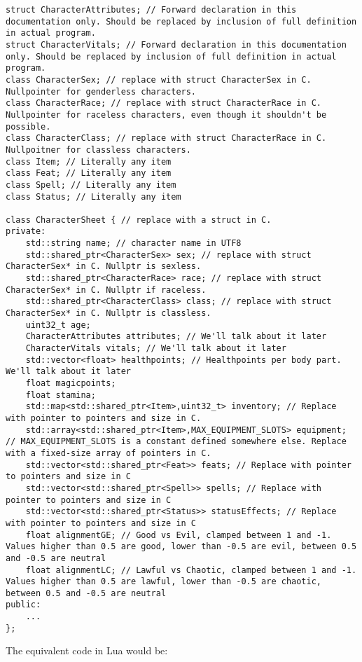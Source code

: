 \documentclass[openany,11pt,a4paper]{book}
\begin{document}
\begin{lstlisting}[style=CPPStyle]
struct CharacterAttributes; // Forward declaration in this documentation only. Should be replaced by inclusion of full definition in actual program.
struct CharacterVitals; // Forward declaration in this documentation only. Should be replaced by inclusion of full definition in actual program.
class CharacterSex; // replace with struct CharacterSex in C. Nullpointer for genderless characters.
class CharacterRace; // replace with struct CharacterRace in C. Nullpointer for raceless characters, even though it shouldn't be possible.
class CharacterClass; // replace with struct CharacterRace in C. Nullpoitner for classless characters.
class Item; // Literally any item
class Feat; // Literally any item
class Spell; // Literally any item
class Status; // Literally any item

class CharacterSheet { // replace with a struct in C.
private:
	std::string name; // character name in UTF8
	std::shared_ptr<CharacterSex> sex; // replace with struct CharacterSex* in C. Nullptr is sexless.
	std::shared_ptr<CharacterRace> race; // replace with struct CharacterSex* in C. Nullptr if raceless.
	std::shared_ptr<CharacterClass> class; // replace with struct CharacterSex* in C. Nullptr is classless.
	uint32_t age;
	CharacterAttributes attributes; // We'll talk about it later
	CharacterVitals vitals; // We'll talk about it later
	std::vector<float> healthpoints; // Healthpoints per body part. We'll talk about it later
	float magicpoints;
	float stamina;
	std::map<std::shared_ptr<Item>,uint32_t> inventory; // Replace with pointer to pointers and size in C.
	std::array<std::shared_ptr<Item>,MAX_EQUIPMENT_SLOTS> equipment; // MAX_EQUIPMENT_SLOTS is a constant defined somewhere else. Replace with a fixed-size array of pointers in C. 
	std::vector<std::shared_ptr<Feat>> feats; // Replace with pointer to pointers and size in C
	std::vector<std::shared_ptr<Spell>> spells; // Replace with pointer to pointers and size in C
	std::vector<std::shared_ptr<Status>> statusEffects; // Replace with pointer to pointers and size in C
	float alignmentGE; // Good vs Evil, clamped between 1 and -1. Values higher than 0.5 are good, lower than -0.5 are evil, between 0.5 and -0.5 are neutral
	float alignmentLC; // Lawful vs Chaotic, clamped between 1 and -1. Values higher than 0.5 are lawful, lower than -0.5 are chaotic, between 0.5 and -0.5 are neutral
public:
	...
};
\end{lstlisting}
The equivalent code in Lua would be:
\end{document}
